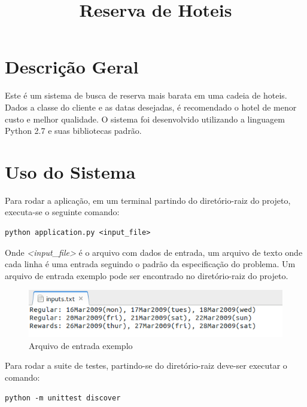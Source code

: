\documentclass[a4paper, 11pt]{article}
\begin{document}
\noindent

\title{Reserva de Hoteis}

\maketitle

\section*{Descrição Geral}
Este é um sistema de busca de reserva mais barata em uma cadeia de hoteis. Dados a classe do cliente e as datas desejadas, é recomendado o hotel de menor custo e melhor qualidade. O sistema foi desenvolvido
utilizando a linguagem Python 2.7 e suas bibliotecas padrão.

\section*{Uso do Sistema}
Para rodar a aplicação, em um terminal partindo do diretório-raiz do projeto, executa-se o seguinte comando:

\begin{lstlisting}
python application.py <input_file>
\end{lstlisting}

Onde \emph{<input\_file>} é o arquivo com dados de entrada, um arquivo de texto onde cada linha é uma entrada seguindo o padrão da especificação do problema. Um arquivo de entrada
exemplo pode ser encontrado no diretório-raiz do projeto.

\begin{figure}[h]
  \begin{center}
   \includegraphics[scale=0.55]{images/input.png}
  \end{center}
  \caption{Arquivo de entrada exemplo}
\end{figure}

Para rodar a suite de testes, partindo-se do diretório-raiz deve-ser executar o comando:

\begin{lstlisting}
python -m unittest discover
\end{lstlisting}
\end{document}
